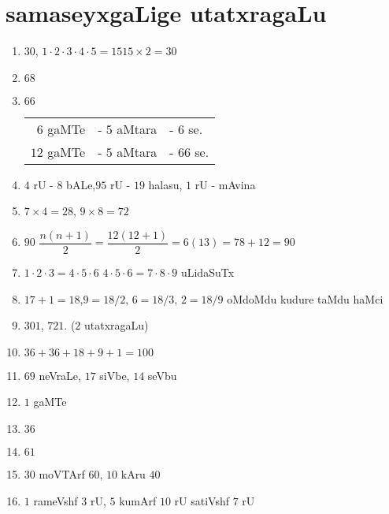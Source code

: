 \chapter{samaseyxgaLige utatxragaLu}

\begin{enumerate}
 \renewcommand{\labelenumi}{\rm(\theenumi)}
\item $30$, \qquad $1 \cdot 2 \cdot 3 \cdot 4 \cdot 5 = 15$\qquad  $15 \times 2 =30$

\item $68$

\item $66$ \qquad \begin{tabular}[t]{rrl}
  $6$ gaMTe&  - $5$ aMtara & - $6$ se.\\
  $12$ gaMTe & - $5$ aMtara & - $66$ se.
\end{tabular}

\item $4$ rU - $8$ bALe,\qquad  $95$ rU - $19$ halasu, \qquad  $1$ rU - mAvina

\item $7 \times 4 = 28$, \qquad $9 \times 8 = 72$

\item $90$ \qquad $\dfrac{n(n+1)}{2} = \dfrac{12(12+1)}{2} = 6(13) = 78 +12 = 90$

\item $1 \cdot 2 \cdot  3 = 4 \cdot  5 \cdot 6$ \qquad $4\cdot 5\cdot 6=7\cdot 8\cdot 9$ uLidaSuTx

\item $17+1 =18$,\quad $9 =18/2$, \quad $6=18/3$, \quad $2 = 18/9$ oMdoMdu kudure taMdu haMci

\item $301$, $721$. ($2$ utatxragaLu)
  
  \eject
  
\item $36+36+18+9+1 = 100$

\item $69$ neVraLe, $17$ siVbe, $14$ seVbu

\item $1$ gaMTe

\item $36$

\item $61$

\item $30$ moVTArf $60$, $10$ kAru $40$

\item $1$ rameVshf $3$ rU, $5$ kumArf $10$ rU satiVshf $7$ rU


\end{enumerate}
